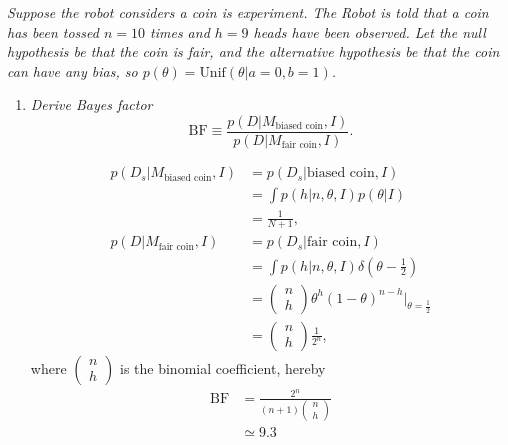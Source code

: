 \begin{example}
	\emph{Suppose the robot considers a coin is experiment. The Robot is told that a coin has been tossed $n=10$ times and $h=9$ heads have been observed. Let the null hypothesis be that the coin is fair, and the alternative hypothesis be that the coin can have any bias, so $p(\theta) = \text{Unif}(\theta|a=0,b=1)$.}\newline
	
	\begin{enumerate}
		\item \emph{Derive Bayes factor}
		\begin{equation}
			\text{BF}\equiv \frac{p(D|M_\text{biased coin},I)}{p(D|M_\text{fair coin},I)}.
		\end{equation}
		
		\begin{equation}
			\begin{split}
				p(D_s|M_\text{biased coin},I) &= p(D_s|\text{biased coin},I)\\
				&=\int p(h|n,\theta,I)p(\theta|I)\\
				&=\frac{1}{N+1},\\
				p(D|M_\text{fair coin},I) &= p(D_s|\text{fair coin},I)\\
				&=\int p(h|n,\theta,I)\delta(\theta-\frac{1}{2})\\
				&=\begin{pmatrix}
					n\\
					h
				\end{pmatrix}\theta^h(1-\theta)^{n-h}|_{\theta=\frac{1}{2}}\\
				& = \begin{pmatrix}
					n\\
					h
				\end{pmatrix}\frac{1}{2^n},
			\end{split}
		\end{equation}
		where $\begin{pmatrix}
			n\\
			h
		\end{pmatrix}$ is the binomial coefficient,	hereby
		\begin{equation}
			\begin{split}
				\text{BF} &= \frac{2^n}{(n+1)\begin{pmatrix}
						n\\
						h
				\end{pmatrix}}\\
				&\simeq 9.3
			\end{split}
		\end{equation}
		

\end{enumerate}
\end{example}
